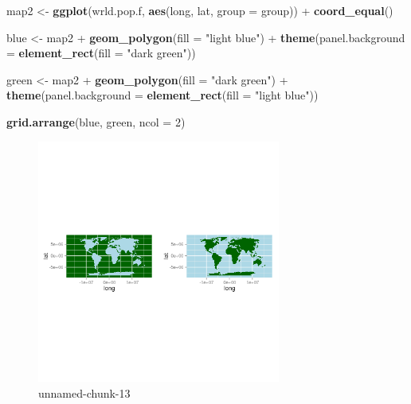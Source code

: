 \documentclass[]{article}
\newenvironment{Shaded}{}{}
\newcommand{\KeywordTok}[1]{\textcolor[rgb]{0.00,0.44,0.13}{\textbf{{#1}}}}
\newcommand{\DataTypeTok}[1]{\textcolor[rgb]{0.56,0.13,0.00}{{#1}}}
\newcommand{\DecValTok}[1]{\textcolor[rgb]{0.25,0.63,0.44}{{#1}}}
\newcommand{\StringTok}[1]{\textcolor[rgb]{0.25,0.44,0.63}{{#1}}}
\newcommand{\NormalTok}[1]{{#1}}
\let\Oldincludegraphics\includegraphics
\renewcommand{\includegraphics}[1]{\Oldincludegraphics[width=8cm]{#1}}
\begin{document}
\begin{Shaded}
\begin{Highlighting}[]
\NormalTok{map2 <- }\KeywordTok{ggplot}\NormalTok{(wrld.pop.f, }\KeywordTok{aes}\NormalTok{(long, lat, }\DataTypeTok{group =} \NormalTok{group)) + }\KeywordTok{coord_equal}\NormalTok{()}

\NormalTok{blue <- map2 + }\KeywordTok{geom_polygon}\NormalTok{(}\DataTypeTok{fill =} \StringTok{"light blue"}\NormalTok{) + }\KeywordTok{theme}\NormalTok{(}\DataTypeTok{panel.background =} \KeywordTok{element_rect}\NormalTok{(}\DataTypeTok{fill =} \StringTok{"dark green"}\NormalTok{))}

\NormalTok{green <- map2 + }\KeywordTok{geom_polygon}\NormalTok{(}\DataTypeTok{fill =} \StringTok{"dark green"}\NormalTok{) + }\KeywordTok{theme}\NormalTok{(}\DataTypeTok{panel.background =} \KeywordTok{element_rect}\NormalTok{(}\DataTypeTok{fill =} \StringTok{"light blue"}\NormalTok{))}

\KeywordTok{grid.arrange}\NormalTok{(blue, green, }\DataTypeTok{ncol =} \DecValTok{2}\NormalTok{)}
\end{Highlighting}
\end{Shaded}
\begin{figure}[htbp]
\centering
\includegraphics{figure/unnamed-chunk-13.png}
\caption{unnamed-chunk-13}
\end{figure}
\end{document}
